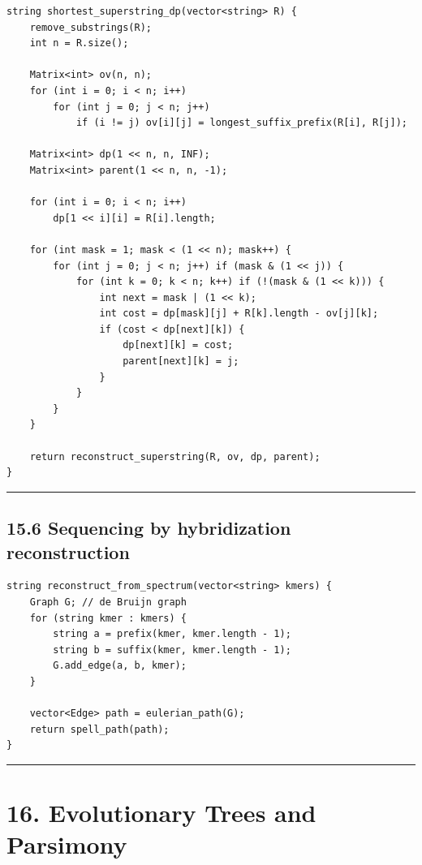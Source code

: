 \documentclass[11pt]{article}
\begin{document}
\begin{verbatim}
string shortest_superstring_dp(vector<string> R) {
    remove_substrings(R);
    int n = R.size();

    Matrix<int> ov(n, n);
    for (int i = 0; i < n; i++)
        for (int j = 0; j < n; j++)
            if (i != j) ov[i][j] = longest_suffix_prefix(R[i], R[j]);

    Matrix<int> dp(1 << n, n, INF);
    Matrix<int> parent(1 << n, n, -1);

    for (int i = 0; i < n; i++)
        dp[1 << i][i] = R[i].length;

    for (int mask = 1; mask < (1 << n); mask++) {
        for (int j = 0; j < n; j++) if (mask & (1 << j)) {
            for (int k = 0; k < n; k++) if (!(mask & (1 << k))) {
                int next = mask | (1 << k);
                int cost = dp[mask][j] + R[k].length - ov[j][k];
                if (cost < dp[next][k]) {
                    dp[next][k] = cost;
                    parent[next][k] = j;
                }
            }
        }
    }

    return reconstruct_superstring(R, ov, dp, parent);
}
\end{verbatim}

\begin{center}\rule{0.5\linewidth}{0.5pt}\end{center}

\subsection{15.6 Sequencing by hybridization reconstruction}\label{sequencing-by-hybridization-reconstruction}

\begin{verbatim}
string reconstruct_from_spectrum(vector<string> kmers) {
    Graph G; // de Bruijn graph
    for (string kmer : kmers) {
        string a = prefix(kmer, kmer.length - 1);
        string b = suffix(kmer, kmer.length - 1);
        G.add_edge(a, b, kmer);
    }

    vector<Edge> path = eulerian_path(G);
    return spell_path(path);
}
\end{verbatim}

\begin{center}\rule{0.5\linewidth}{0.5pt}\end{center}

\section{16. Evolutionary Trees and Parsimony}\label{evolutionary-trees-and-parsimony}
\end{document}
